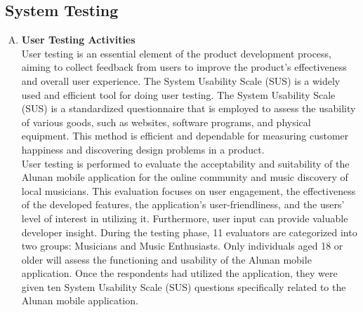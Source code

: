\subsection{System Testing}
\begin{enumerate}[A.]
    \item \textbf{User Testing Activities} \\
    User testing is an essential element of the product development process, aiming to collect feedback from users to improve the product's effectiveness and overall user experience. The System Usability Scale (SUS) is a widely used and efficient tool for doing user testing. The System Usability Scale (SUS) is a standardized questionnaire that is employed to assess the usability of various goods, such as websites, software programs, and physical equipment. This method is efficient and dependable for measuring customer happiness and discovering design problems in a product. \\

    User testing is performed to evaluate the acceptability and suitability of the Alunan mobile application for the online community and music discovery of local musicians. This evaluation focuses on user engagement, the effectiveness of the developed features, the application's user-friendliness, and the users' level of interest in utilizing it. Furthermore, user input can provide valuable developer insight. During the testing phase, 11 evaluators are categorized into two groups: Musicians and Music Enthusiasts. Only individuals aged 18 or older will assess the functioning and usability of the Alunan mobile application. Once the respondents had utilized the application, they were given ten System Usability Scale (SUS) questions specifically related to the Alunan mobile application.
    \clearpage


\end{enumerate}

